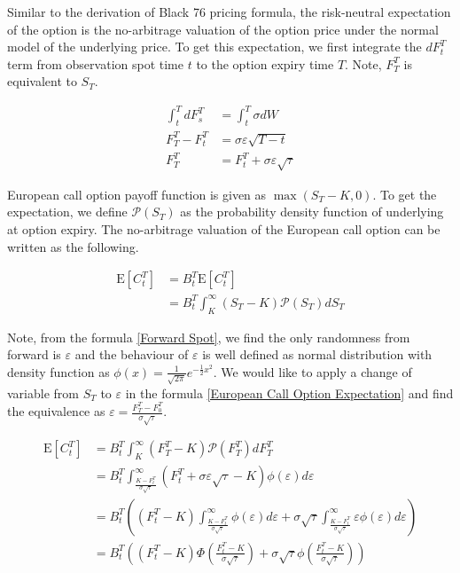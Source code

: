 \documentclass{article}
\begin{document}
Similar to the derivation of Black 76 pricing formula, the risk-neutral expectation of the option is the no-arbitrage valuation of the option price under the normal model of the underlying price.
To get this expectation, we first integrate the $ dF_t^T $ term from observation spot time $ t $ to the option expiry time $ T $.
Note, $ F_T^T $ is equivalent to $ S_T $.

\begin{align} \label{Forward Spot}
    \int_t^T dF_s^T &= \int_t^T \sigma dW \nonumber \\
    F_T^T - F_t^T &=  \sigma \varepsilon \sqrt{T - t} \nonumber \\
    F_T^T &= F_t^T +  \sigma \varepsilon \sqrt{\tau}
\end{align}

European call option payoff function is given as $ \max(S_T - K, 0) $.
To get the expectation, we define $ \mathcal{P} (S_T) $ as the probability density function of underlying at option expiry.
The no-arbitrage valuation of the European call option can be written as the following.

\begin{align} \label{European Call Option Expectation}
    \mathrm{E}\left[C_t^T\right] &= B_t^T \mathrm{E}\left[C_t^T\right] \nonumber \\
    &= B_t^T \int_{K}^{\infty}{(S_T - K) \mathcal{P}(S_T) dS_T}
\end{align}

Note, from the formula \ref{Forward Spot}, we find the only randomness from forward is $ \varepsilon $ and the behaviour of $ \varepsilon $ is well defined as normal distribution with density function as $ \phi(x) = \frac{1}{\sqrt{2 \pi}} e^{-\frac{1}{2} x^2} $.
We would like to apply a change of variable from $ S_T $ to $ \varepsilon $ in the formula \ref{European Call Option Expectation} and find the equivalence as $ \varepsilon = \frac{F_T^T - F_0^T}{\sigma \sqrt{\tau}}$.

\begin{align} \label{European Call Option Price}
    \mathrm{E}\left[C_t^T\right] &= B_t^T \int_{K}^{\infty}{(F_T^T - K) \mathcal{P}(F_T^T) dF_T^T} \nonumber \\
    &= B_t^T \int_{\frac{K - F_t^T}{\sigma \sqrt{\tau}}}^{\infty}{\left(F_t^T + \sigma \varepsilon \sqrt{\tau} - K\right) \phi(\varepsilon) d\varepsilon} \nonumber \\
    &= B_t^T \left(\left(F_t^T - K\right) \int_{\frac{K - F_t^T}{\sigma \sqrt{\tau}}}^{\infty}{\phi(\varepsilon) d\varepsilon} + \sigma \sqrt{\tau} \int_{\frac{K - F_t^T}{\sigma \sqrt{\tau}}}^{\infty}{\varepsilon \phi(\varepsilon) d\varepsilon} \right) \nonumber \\
    &= B_t^T \left(\left(F_t^T - K\right) \Phi\left(\frac{F_t^T - K}{\sigma \sqrt{\tau}}\right) + \sigma \sqrt{\tau} \phi\left(\frac{F_t^T - K}{\sigma \sqrt{\tau}}\right) \right)
\end{align}
\end{document}
